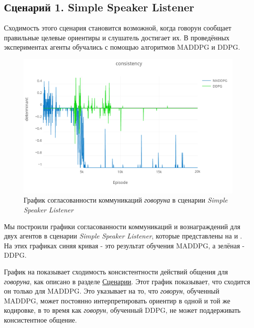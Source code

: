 \subsection{Сценарий 1. Simple Speaker Listener}

Сходимость этого сценария становится возможной, когда говорун сообщает правильные целевые ориентиры и слушатель достигает их. В проведённых экспериментах агенты обучались с помощью алгоритмов MADDPG и DDPG.

\begin{figure}[ht!]
    \center
    \includegraphics [scale=0.38] {my_folder/images/ch5/ssl-comm.png}
    \caption{График согласованности коммуникаций \textit{говоруна} в сценарии \textit{Simple Speaker Listener}}
    \label{fig:result-ssl-comm}
\end{figure}

Мы построили графики согласованности коммуникаций и вознаграждений для двух агентов в сценарии \textit{Simple Speaker Listener}, которые представлены на  и . На этих графиках синяя кривая - это результат обучения MADDPG, а зелёная - DDPG.

График на  показывает сходимость консистентности действий общения для \textit{говоруна}, как описано в разделе \hyperref[exp-ssl]{Сценарии}. Этот график показывает, что сходится он только для MADDPG. Это указывает на то, что \textit{говорун}, обученный MADDPG, может постоянно интерпретировать ориентир в одной и той же кодировке, в то время как \textit{говорун}, обученный DDPG, не может поддерживать консистентное общение.

